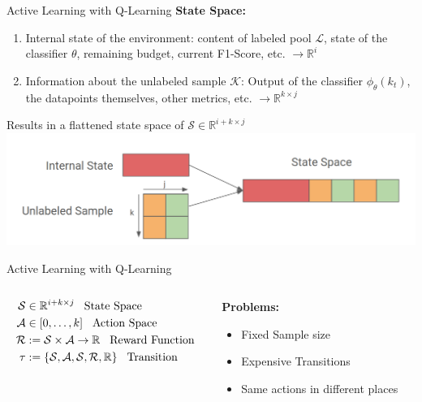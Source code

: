 \documentclass[aspectratio=169, 11pt, invertlogo]{ismll-slides}
\begin{document}

\begin{frame}[fragile]{Active Learning with Q-Learning}
	\textbf{State Space:} \\ [2mm]
	\begin{enumerate}
		\item Internal state of the environment: content of labeled pool $\mathcal{L}$, state of the classifier $\theta$, remaining budget, current F1-Score, etc. $\rightarrow \mathbb{R}^{i}$
		\item Information about the unlabeled sample $\mathcal{K}$: Output of the classifier $\phi_\theta(k_t)$, the datapoints themselves, other metrics, etc. $\rightarrow \mathbb{R}^{k \times j}$
	\end{enumerate}
	Results in a flattened state space of $\mathcal{S} \in \mathbb{R}^{i + k \times j}$ \\
	\includegraphics[width=.9\linewidth]{pics/state_space}
\end{frame}



\begin{frame}[fragile]{Active Learning with Q-Learning}
\begin{columns}
	\begin{column}{.4\linewidth}
		\begin{align*}
		\mathcal{S} &\in \mathbb{R}^{i + k \times j} \hspace{3mm}\text{State Space} \\
		\mathcal{A} &\in [0, \ldots, k] \hspace{3mm}\text{Action Space} \\
		\mathcal{R} &:= \mathcal{S} \times \mathcal{A} \rightarrow \mathbb{R} \hspace{3mm}\text{Reward Function} \\
		\tau &:= \{ \mathcal{S}, \mathcal{A}, \mathcal{S}, \mathcal{R}, \mathbb{R} \} \hspace{3mm}\text{Transition} \\
		\end{align*}
	\end{column}
	\begin{column}{.4\linewidth}
		\textbf{Problems:}
		\begin{itemize}
			\item Fixed Sample size
			\item Expensive Transitions
			\item Same actions in different places
		\end{itemize}
	\end{column}
\end{columns}
\end{frame}
\end{document}
